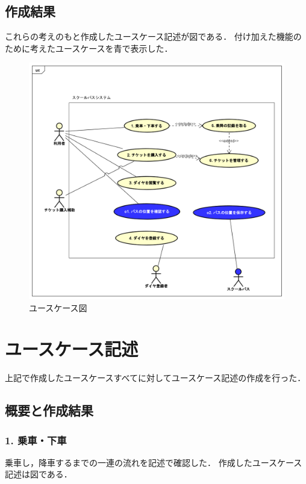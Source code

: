 \documentclass[documentclass]{jsarticle}
\begin{document}
\subsection*{作成結果}
これらの考えのもと作成したユースケース記述が図である．
付け加えた機能のために考えたユースケースを青で表示した．

\begin{figure}[H]
  \begin{center}
    \includegraphics*[scale=0.4]{figure/3-1.png}
  \end{center}
  \caption{ユースケース図}
  \label{fig:3-1}
\end{figure}
\newpage

\section{ユースケース記述}
上記で作成したユースケースすべてに対してユースケース記述の作成を行った．
\subsection*{概要と作成結果}
\subsubsection*{1. 乗車・下車}
乗車し，降車するまでの一連の流れを記述で確認した．
作成したユースケース記述は図である．
\end{document}
